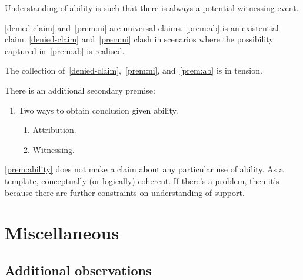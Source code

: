Understanding of ability is such that there is always a potential witnessing event.

\ref{denied-claim} and~\ref{prem:ni} are universal claims.
\ref{prem:ab} is an existential claim.
\ref{denied-claim} and~\ref{prem:ni} clash in scenarios where the possibility captured in~\ref{prem:ab} is realised.

The collection of~\ref{denied-claim},~\ref{prem:ni}, and~\ref{prem:ab} is in tension.

There is an additional secondary premise:

\begin{note}
\begin{enumerate}
\item\label{prem:ability} Two ways to obtain conclusion given ability.
  \begin{enumerate}
  \item Attribution.
  \item Witnessing.
  \end{enumerate}
\end{enumerate}

\ref{prem:ability} does not make a claim about any particular use of ability.
As a template, conceptually (or logically) coherent.
If there's a problem, then it's because there are further constraints on understanding of support.
\end{note}

\section{Miscellaneous}
\label{sec:misc}


\subsection{Additional observations}
\label{sec:addit-observ}

